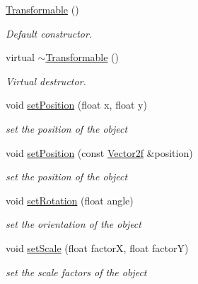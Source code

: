 \begin{DoxyCompactItemize}
\item 
\mbox{\label{classsf_1_1_transformable_ae71710de0fef423121bab1c684954a2e}} 
\hyperlink{classsf_1_1_transformable_ae71710de0fef423121bab1c684954a2e}{Transformable} ()
\begin{DoxyCompactList}\small\item\em Default constructor. \end{DoxyCompactList}\item 
\mbox{\label{classsf_1_1_transformable_a43253abcb863195a673c2a347a7425cc}} 
virtual \hyperlink{classsf_1_1_transformable_a43253abcb863195a673c2a347a7425cc}{$\sim$\+Transformable} ()
\begin{DoxyCompactList}\small\item\em Virtual destructor. \end{DoxyCompactList}\item 
void \hyperlink{classsf_1_1_transformable_a4dbfb1a7c80688b0b4c477d706550208}{set\+Position} (float x, float y)
\begin{DoxyCompactList}\small\item\em set the position of the object \end{DoxyCompactList}\item 
void \hyperlink{classsf_1_1_transformable_af1a42209ce2b5d3f07b00f917bcd8015}{set\+Position} (const \hyperlink{classsf_1_1_vector2}{Vector2f} \&position)
\begin{DoxyCompactList}\small\item\em set the position of the object \end{DoxyCompactList}\item 
void \hyperlink{classsf_1_1_transformable_a32baf2bf1a74699b03bf8c95030a38ed}{set\+Rotation} (float angle)
\begin{DoxyCompactList}\small\item\em set the orientation of the object \end{DoxyCompactList}\item 
void \hyperlink{classsf_1_1_transformable_aaec50b46b3f41b054763304d1e727471}{set\+Scale} (float factorX, float factorY)
\begin{DoxyCompactList}\small\item\em set the scale factors of the object \end{DoxyCompactList}\item 

\end{DoxyCompactItemize}
